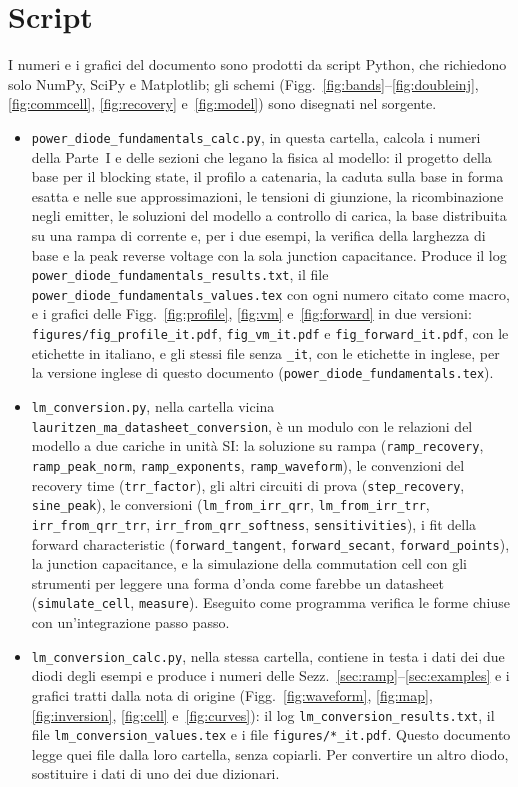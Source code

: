 \documentclass[10pt,a4paper]{scrartcl}
\begin{document}
\section{Script}
\label{app:scripts}
I numeri e i grafici del documento sono prodotti da script Python, che richiedono solo NumPy, SciPy e Matplotlib; gli schemi (Figg.~\ref{fig:bands}--\ref{fig:doubleinj}, \ref{fig:commcell}, \ref{fig:recovery} e~\ref{fig:model}) sono disegnati nel sorgente.
\begin{itemize}
\emergencystretch=3em\raggedright
\item \texttt{power\_diode\_fundamentals\_calc.py}, in questa cartella, calcola i numeri della Parte~I e delle sezioni che legano la fisica al modello: il progetto della base per il blocking state, il profilo a catenaria, la caduta sulla base in forma esatta e nelle sue approssimazioni, le tensioni di giunzione, la ricombinazione negli emitter, le soluzioni del modello a controllo di carica, la base distribuita su una rampa di corrente e, per i due esempi, la verifica della larghezza di base e la peak reverse voltage con la sola junction capacitance. Produce il log \texttt{power\_diode\_fundamentals\_results.txt}, il file \texttt{power\_diode\_fundamentals\_values.tex} con ogni numero citato come macro, e i grafici delle Figg.~\ref{fig:profile}, \ref{fig:vm} e~\ref{fig:forward} in due versioni: \texttt{figures/fig\_profile\_it.pdf}, \texttt{fig\_vm\_it.pdf} e \texttt{fig\_forward\_it.pdf}, con le etichette in italiano, e gli stessi file senza \texttt{\_it}, con le etichette in inglese, per la versione inglese di questo documento (\texttt{power\_diode\_fundamentals.tex}).
\item \texttt{lm\_conversion.py}, nella cartella vicina \texttt{lauritzen\_ma\_datasheet\_conversion}, è un modulo con le relazioni del modello a due cariche in unità SI: la soluzione su rampa (\texttt{ramp\_recovery}, \texttt{ramp\_peak\_norm}, \texttt{ramp\_exponents}, \texttt{ramp\_waveform}), le convenzioni del recovery time (\texttt{trr\_factor}), gli altri circuiti di prova (\texttt{step\_recovery}, \texttt{sine\_peak}), le conversioni (\texttt{lm\_from\_irr\_qrr}, \texttt{lm\_from\_irr\_trr}, \texttt{irr\_from\_qrr\_trr}, \texttt{irr\_from\_qrr\_softness}, \texttt{sensitivities}), i fit della forward characteristic (\texttt{forward\_tangent}, \texttt{forward\_secant}, \texttt{forward\_points}), la junction capacitance, e la simulazione della commutation cell con gli strumenti per leggere una forma d'onda come farebbe un datasheet (\texttt{simulate\_cell}, \texttt{measure}). Eseguito come programma verifica le forme chiuse con un'integrazione passo passo.
\item \texttt{lm\_conversion\_calc.py}, nella stessa cartella, contiene in testa i dati dei due diodi degli esempi e produce i numeri delle Sezz.~\ref{sec:ramp}--\ref{sec:examples} e i grafici tratti dalla nota di origine (Figg.~\ref{fig:waveform}, \ref{fig:map}, \ref{fig:inversion}, \ref{fig:cell} e~\ref{fig:curves}): il log \texttt{lm\_conversion\_results.txt}, il file \texttt{lm\_conversion\_values.tex} e i file \texttt{figures/*\_it.pdf}. Questo documento legge quei file dalla loro cartella, senza copiarli. Per convertire un altro diodo, sostituire i dati di uno dei due dizionari.
\end{itemize}
\end{document}
